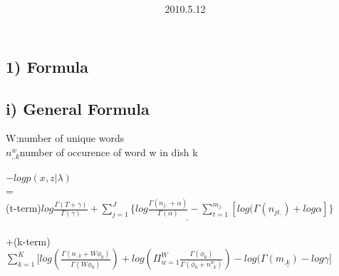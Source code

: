 \documentclass{article}
\title{\vspace{0.3in}\textmd{\textbf{\hmwkTitle}}}
\date{2010.5.12}
\author{\textbf{\hmwkAuthorName}}
\begin{document}
\begin{spacing}{1.1}
\maketitle
\section{1) Formula}
\subsection{i) General Formula}
W:number of unique words\\ 
$n_{..k}^{w}$number of occurence of word w in dish k \\ \\
$-log p(x,z|\lambda)$\\ =\\
(t-term)$ \underline{log \frac{\Gamma(T+\gamma)}{\Gamma(\gamma)}+\sum_{j=1}^{J} \{log \frac{\Gamma(n_{j..}+\alpha)}{\Gamma(\alpha)}-\sum_{t=1}^{m_{j.}}[log(\Gamma(n_{jt.})+log \alpha
]\}}$\\ \\
+(k-term)$ \sum_{k=1}^{K} [log(\frac{\Gamma(n_{..k}+W\phi_{0})}{\Gamma(W\phi_{0})})+log(\Pi_{w=1}^{W}\frac{\Gamma(\phi_{0})}{\Gamma(\phi_{0}+n_{..k}^{w})})
-\underline{log(\Gamma(m_{.k})-log \gamma]}$\\ \\ 


\end{spacing}
\end{document}
